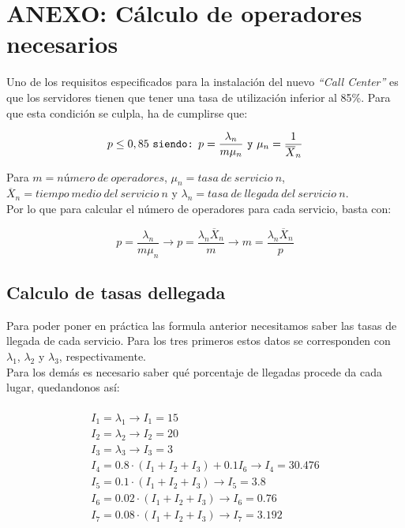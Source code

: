 \section{ANEXO: Cálculo de operadores necesarios}
Uno de los requisitos especificados para la instalación del nuevo \emph{``Call Center''} es que los servidores tienen que tener una tasa de utilización inferior al 85\%. Para que esta condición se culpla, ha de cumplirse que:

\begin{equation}
p \leq 0,85 \text{ \texttt{siendo:} }
p = \frac{\lambda_{n}}{m\mu_{n}} \text{ \texttt{y} } \mu_{n}= \frac{1}{\overline{X}_{n}}
\end{equation}

Para $m= número\ de\ operadores$, $\mu_{n} = tasa\ de\ servicio\ n$, $\overline{X}_{n} = tiempo\ medio\ del\ servicio\ n$ y $\lambda_{n} = tasa\ de\ llegada\ del\ servicio\ n$.\\
Por lo que para calcular el número de operadores para cada servicio, basta con:

\begin{equation}
p = \frac{\lambda_{n}}{m\mu_{n}} \rightarrow p = \frac{\lambda_{n}\overline{X}_{n}}{m} \rightarrow m = \frac{\lambda_{n}\overline{X}_{n}}{p}
\end{equation}

\subsection{Calculo de tasas dellegada}
Para poder poner en práctica las formula anterior necesitamos saber las tasas de llegada de cada servicio. Para los tres primeros estos datos se corresponden con $\lambda_{1}$, $\lambda_{2}$ y $\lambda_{3}$, respectivamente.\\

Para los demás es necesario saber qué porcentaje de llegadas procede da cada lugar, quedandonos así:

\begin{multline}\\
  I_{1} = \lambda_{1} \rightarrow I_{1} = 15 \\
  I_{2} = \lambda_{2} \rightarrow I_{2} = 20 \\
  I_{3} = \lambda_{3} \rightarrow I_{3} = 3 \\
  I_{4} = 0.8\cdot (I_{1}+I_{2}+I_{3}) + 0.1I_{6} \rightarrow I_{4} = 30.476 \\
  I_{5} = 0.1\cdot (I_{1}+I_{2}+I_{3})  \rightarrow I_{5} = 3.8 \\
  I_{6} = 0.02\cdot (I_{1}+I_{2}+I_{3})  \rightarrow I_{6} = 0.76 \\
  I_{7} = 0.08\cdot (I_{1}+I_{2}+I_{3})  \rightarrow I_{7} = 3.192 \\
  \end{multline}

